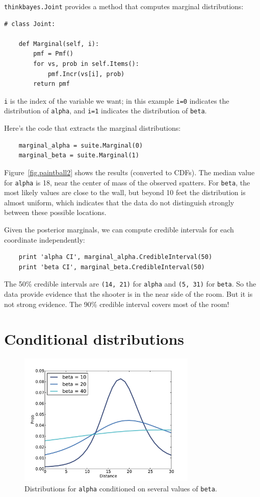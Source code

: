 \documentclass[12pt]{book}
\begin{document}
{\tt thinkbayes.Joint} provides a method that computes marginal
distributions:

\begin{verbatim}
# class Joint:

    def Marginal(self, i):
        pmf = Pmf()
        for vs, prob in self.Items():
            pmf.Incr(vs[i], prob)
        return pmf
\end{verbatim}

{\tt i} is the index of the variable we want; in this example
{\tt i=0} indicates the distribution of {\tt alpha}, and
{\tt i=1} indicates the distribution of {\tt beta}.

Here's the code that extracts the marginal distributions:

\begin{verbatim}
    marginal_alpha = suite.Marginal(0)
    marginal_beta = suite.Marginal(1)
\end{verbatim}

Figure~\ref{fig.paintball2} shows the results (converted to CDFs).
The median value for {\tt alpha} is 18, near the center of mass of
the observed spatters.  For {\tt beta}, the most likely values are
close to the wall, but beyond 10 feet the distribution is almost
uniform, which indicates that the data do not distinguish strongly
between these possible locations.

Given the posterior marginals, we can compute credible intervals
for each coordinate independently:

\begin{verbatim}
    print 'alpha CI', marginal_alpha.CredibleInterval(50)
    print 'beta CI', marginal_beta.CredibleInterval(50)
\end{verbatim}

The 50\% credible intervals are {\tt (14, 21)} for {\tt alpha} and
{\tt (5, 31)} for {\tt beta}.  So the data provide evidence that the
shooter is in the near side of the room.  But it is not strong
evidence.  The 90\% credible interval covers most of the room!


\section{Conditional distributions}

\begin{figure}
\centerline{\includegraphics[height=2.5in]{figs/paintball3.pdf}}
\caption{Distributions for {\tt alpha} conditioned on several values
of {\tt beta}.}
\label{fig.paintball3}
\end{figure}
\end{document}
